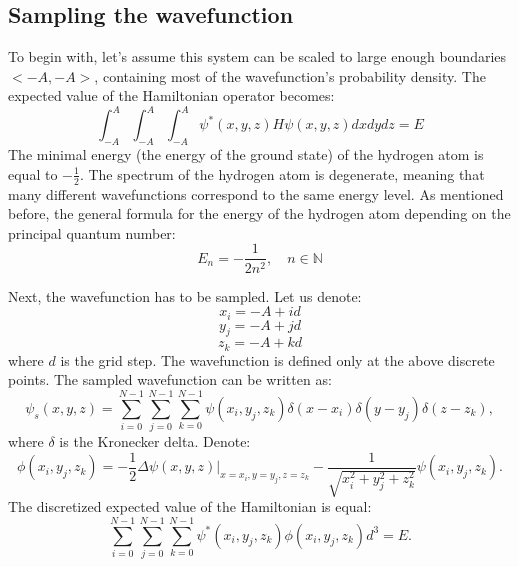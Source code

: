 \subsection{Sampling the wavefunction}

To begin with, let's assume this system can be scaled to large enough boundaries $<-A,-A>$, containing most of the wavefunction's probability density. The expected value of the Hamiltonian operator becomes:
\begin{equation}
	\int_{-A}^A\int_{-A}^{A}\int_{-A}^{A}\psi^{*}(x,y,z) H \psi(x,y,z)  dx dy dz = E
\end{equation}
The minimal energy (the energy of the ground state) of the hydrogen atom is equal to $-\frac{1}{2}$. The spectrum of the hydrogen atom
is degenerate, meaning that many different wavefunctions correspond to the
same energy level. As mentioned before, the general formula for the energy of the hydrogen atom
depending on the principal quantum number:
\begin{equation}
	E_n = -\frac{1}{2n^2}, \quad n \in \mathbb{N}
\end{equation}


\noindent Next, the wavefunction has to be sampled. Let us denote:
\begin{equation}
	x_i = -A + id
\end{equation}
\begin{equation}
	y_j = -A + jd
\end{equation}	
\begin{equation}
	z_k = -A + kd
\end{equation}	
where $d$ is the grid step. 
The wavefunction is defined only at the above discrete points. The sampled wavefunction can be written as:
\begin{equation}
	\psi_s(x,y,z) = \sum_{i=0}^{N-1}\sum_{j=0}^{N-1}\sum_{k=0}^{N-1}\psi(x_i,y_j,z_k)\delta(x-x_i)\delta(y-y_j)\delta(z-z_k),
\end{equation}
where $\delta$ is the Kronecker delta. %
Denote:
\begin{equation}
	\phi(x_i,y_j,z_k) = -\frac{1}{2}\Delta\psi(x,y,z)\rvert_{x=x_i,y=y_j,z=z_k}-\frac{1}{\sqrt{x_i^2+y_j^2+z_k^2}}\psi(x_i,y_j,z_k).
\end{equation}
The discretized expected value of the Hamiltonian is equal:
\begin{equation}
	\sum_{i=0}^{N-1}\sum_{j=0}^{N-1}\sum_{k=0}^{N-1}\psi^{*}(x_i,y_j,z_k)\phi(x_i,y_j,z_k)d^3 = E.
\end{equation}


